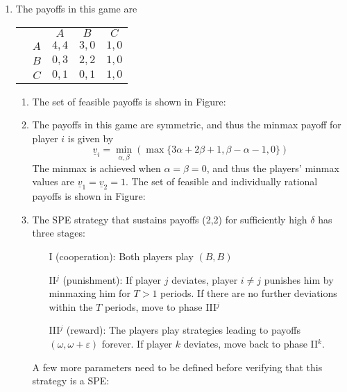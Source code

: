 \documentclass[11pt]{article}
\begin{document}
\begin{enumerate}
	\item The payoffs in this game are
	\begin{table}[!htbp]
		\centering
		\setlength{\extrarowheight}{2pt}
		\begin{tabular}{cc|c|c|c|}
			& \multicolumn{1}{c}{} & \multicolumn{1}{c}{$A$}  & \multicolumn{1}{c}{$B$} & \multicolumn{1}{c}{$ C $} \\\cline{3-5}
			& $A$ & $ 4,4 $ & $ 3,0 $ & $ 1,0 $\\\cline{3-5}
			& $B$ & $ 0,3 $ & $ 2,2 $ & $ 1,0 $\\\cline{3-5}
			& $C$ & $ 0,1 $ & $ 0,1 $ & $ 1,0 $\\\cline{3-5}
		\end{tabular}
	\end{table}
	\begin{enumerate}
		\item The set of feasible payoffs is shown in Figure:
		
		\item The payoffs in this game are symmetric, and thus the minmax payoff for player $ i $ is given by 
		\[\underline{v}_i = \min_{\alpha, \beta} (\max\{3\alpha + 2\beta + 1, \beta - \alpha - 1, 0\})\]
		The minmax is achieved when $ \alpha = \beta = 0 $, and thus the players' minmax values are $ \underline{v}_1 = \underline{v}_2 = 1 $. The set of feasible and individually rational payoffs is shown in Figure: 
		
		\item The SPE strategy that sustains payoffs (2,2) for sufficiently high $\delta$ has three stages:
		\begin{itemize}
			\item [I] (cooperation): Both players play $ (B,B) $
			\item [II$ ^j $] (punishment): If player $ j $ deviates, player $ i\neq j $ punishes him by minmaxing him for $ T > 1 $ periods. If there are no further deviations within the $ T $ periods, move to phase III$ ^j $
			\item [III$ ^j $] (reward): The players play strategies leading to payoffs $ (\omega, \omega + \varepsilon) $ forever. If player $ k $ deviates, move back to phase II$ ^k $.
		\end{itemize}
		A few more parameters need to be defined before verifying that this strategy is a SPE:
		

\end{enumerate}
\end{enumerate}
\end{document}

